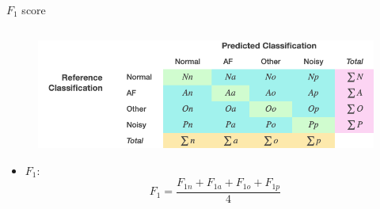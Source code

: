 \begin{frame}{$F_1$ score}
\begin{overprint}
\begin{columns}
\begin{itemize}
                \end{itemize}
                \end{columns}
                
                
            \begin{figure}[H]
                \centering
                \includegraphics[width=\textwidth]{Images/metrica_2.png}
            \end{figure}
        \begin{itemize}
            \item $F_1:$     
            \begin{equation*}
                F_1 = \frac{F_{1n} + F_{1a} + F_{1o} + F_{1p}}{4}
            \end{equation*}
        \end{itemize}

    \end{overprint}
\end{frame}

